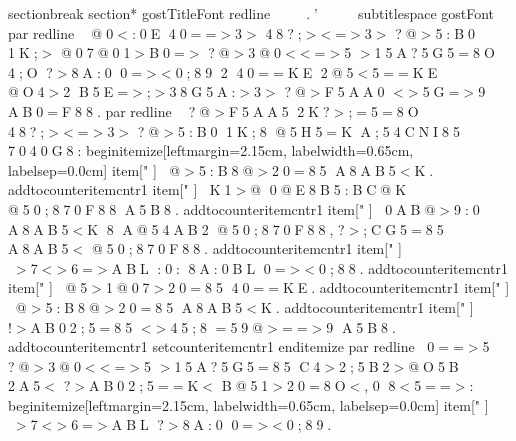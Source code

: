 
 
 
 
 \ s e c t i o n b r e a k   \ s e c t i o n * { 
 
 	 \ g o s t T i t l e F o n t 
 
 	 \ r e d l i n e 
 
 	 .'
 
 } 
 
 
 
 
 
 
 
 \ s u b t i t l e s p a c e 
 
 
 
 { \ g o s t F o n t 
 
 	 \ p a r   \ r e d l i n e     @0<:0E  40==>3>  48?;><=>3>  ?@>5:B0  1K;>  @07@01>B0=>  ?@>3@0<<=>5  >15A?5G5=8O  4;O  ?>8A:0  0=><0;89  2  40==KE  2@5<5==KE  @O4>2  B5E=>;>38G5A:>3>  ?@>F5AA0  <>5G=>9  AB0=F88.   
 
 	 \ p a r   \ r e d l i n e     ?@>F5AA5  2K?>;=5=8O  48?;><=>3>  ?@>5:B0  1K;8  @5H5=K  A;54CNI85  7040G8: 
 
 	 
 
 	 \ b e g i n { i t e m i z e } [ l e f t m a r g i n = 2 . 1 5 c m ,   l a b e l w i d t h = 0 . 6 5 c m ,   l a b e l s e p = 0 . 0 c m ]   
 
 	 	 
 
 	 	 \ i t e m [ "   ]   @>5:B8@>20=85  A8AB5<K. 	 	 
 
 	 	 \ a d d t o c o u n t e r { i t e m c n t r } { 1 } 
 
 	 	 
 
 	 	 \ i t e m [ "   ]   K1>@  0@E8B5:BC@K  @50;870F88  A5B8. 	 	 
 
 	 	 \ a d d t o c o u n t e r { i t e m c n t r } { 1 } 
 
 	 	 
 
 	 	 \ i t e m [ "   ]   0AB@>9:0  A8AB5<K  8  A@54AB2  @50;870F88,   ?>;CG5=85  A8AB5<  @50;870F88.   	 	 
 
 	 	 \ a d d t o c o u n t e r { i t e m c n t r } { 1 } 
 
 	 	 
 
 	 	 \ i t e m [ "   ]   >7<>6=>ABL  :0:  8A:0BL  0=><0;88. 	 	 
 
 	 	 \ a d d t o c o u n t e r { i t e m c n t r } { 1 } 
 
 	 	 
 
 	 	 \ i t e m [ "   ]   @5>1@07>20=85  40==KE. 	 	 
 
 	 	 \ a d d t o c o u n t e r { i t e m c n t r } { 1 } 
 
 	 	 
 
 	 	 \ i t e m [ "   ]   @>5:B8@>20=85  A8AB5<K. 	 	 
 
 	 	 \ a d d t o c o u n t e r { i t e m c n t r } { 1 } 
 
 	 	 
 
 	 	 \ i t e m [ "   ]   !>AB02;5=85  <>45;8  =59@>==>9  A5B8. 	 	 
 
 	 	 \ a d d t o c o u n t e r { i t e m c n t r } { 1 } 
 
 	 	 
 
 	 	 \ s e t c o u n t e r { i t e m c n t r } { 1 } 
 
 	 \ e n d { i t e m i z e }   
 
 
 
 	 \ p a r   \ r e d l i n e   0==>5  ?@>3@0<<=>5  >15A?5G5=85  C4>2;5B2>@O5B  2A5<  ?>AB02;5==K<  B@51>20=8O<,   0  8<5==>: 
 
 	 
 
 	 \ b e g i n { i t e m i z e } [ l e f t m a r g i n = 2 . 1 5 c m ,   l a b e l w i d t h = 0 . 6 5 c m ,   l a b e l s e p = 0 . 0 c m ]   
 
 	 	 
 
 	 	 \ i t e m [ "   ]   >7<>6=>ABL  ?>8A:0  0=><0;89. 	 
}
